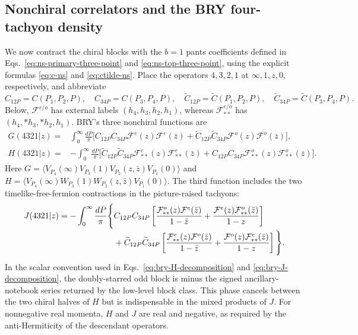 \documentclass[11pt]{article}
\begin{document}
\subsection{Nonchiral correlators and the BRY four-tachyon density}
\label{subsec:bry-sphere-correlators}

We now contract the chiral blocks with the $b=1$ pants coefficients defined
in Eqs.~\eqref{eq:ns-primary-three-point} and
\eqref{eq:ns-top-three-point}, using the explicit formulas
\eqref{eq:c-ns} and \eqref{eq:ctilde-ns}.  Place the operators $4,3,2,1$
at $\infty,1,z,0$, respectively, and abbreviate
\begin{equation}
 C_{12P}=C(P_1,P_2,P),\quad C_{34P}=C(P_3,P_4,P),\quad
 \widetilde C_{12P}=\widetilde C(P_1,P_2,P),\quad
 \widetilde C_{34P}=\widetilde C(P_3,P_4,P).
 \label{eq:sphere-four-point-coefficient-shorthand}
\end{equation}
Below, $\mathcal F^{e/o}$ has external labels $(h_4,h_3,h_2,h_1)$, whereas
$\mathcal F^{e/o}_{**}$ has $(h_4,*h_3,*h_2,h_1)$.  BRY's three
nonchiral functions are
\begin{align}
 G(4321|z)={}&\int_0^\infty\frac{dP}{\pi}\bigl[
 C_{12P}C_{34P}\mathcal F^e(z)\mathcal F^e(\bar z)
 +\widetilde C_{12P}\widetilde C_{34P}
 \mathcal F^o(z)\mathcal F^o(\bar z)\bigr],
 \label{eq:bry-G-decomposition}\\
 H(4321|z)={}&-\int_0^\infty\frac{dP}{\pi}\bigl[
 \widetilde C_{12P}\widetilde C_{34P}
 \mathcal F^e_{**}(z)\mathcal F^e_{**}(\bar z)
 +C_{12P}C_{34P}\mathcal F^o_{**}(z)
 \mathcal F^o_{**}(\bar z)\bigr].
 \label{eq:bry-H-decomposition}
\end{align}
Here
$G=\langle V_{P_4}(\infty)V_{P_3}(1)V_{P_2}(z,\bar z)V_{P_1}(0)\rangle$
and
$H=\langle V_{P_4}(\infty)W_{P_3}(1)W_{P_2}(z,\bar z)V_{P_1}(0)\rangle$.
The third function includes the two timelike-free-fermion contractions in
the picture-raised tachyons:
\begin{align}
 J(4321|z)=-\int_0^\infty\frac{dP}{\pi}\Bigg\{&
 C_{12P}C_{34P}\left[
 \frac{\mathcal F^o_{**}(z)\mathcal F^e(\bar z)}{1-\bar z}
 +\frac{\mathcal F^e(z)\mathcal F^o_{**}(\bar z)}{1-z}\right]
 \notag\\[-2pt]
 &+\widetilde C_{12P}\widetilde C_{34P}\left[
 \frac{\mathcal F^e_{**}(z)\mathcal F^o(\bar z)}{1-\bar z}
 +\frac{\mathcal F^o(z)\mathcal F^e_{**}(\bar z)}{1-z}\right]
 \Bigg\}.
 \label{eq:bry-J-decomposition}
\end{align}
In the scalar convention used in Eqs.~\eqref{eq:bry-H-decomposition} and
\eqref{eq:bry-J-decomposition}, the doubly-starred odd block is minus the
signed ancillary-notebook series returned by the low-level block class.
This phase cancels between the two chiral halves of $H$ but is indispensable
in the mixed products of $J$.  For nonnegative real momenta, $H$ and $J$ are
real and negative, as required by the anti-Hermiticity of the descendant
operators.
\end{document}
